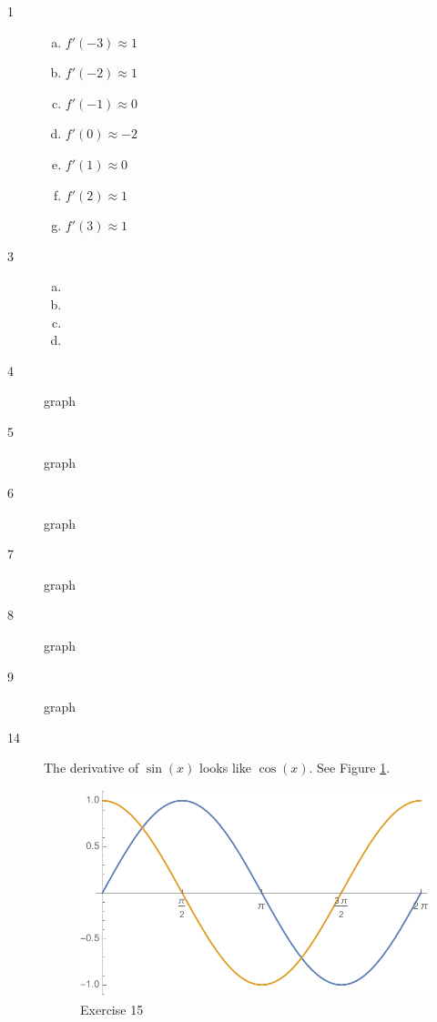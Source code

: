 \documentclass[letterpaper, landscape]{exam}
\begin{document}
    \begin{description}

      \item[1] 
        \begin{enumerate}[(a)]
          \item $f'(-3) \approx 1$
          \item $f'(-2) \approx 1$
          \item $f'(-1) \approx 0$
          \item $f'(0) \approx -2$
          \item $f'(1) \approx 0$
          \item $f'(2) \approx 1$
          \item $f'(3) \approx 1$
        \end{enumerate}

      \item[3] 
        \begin{enumerate}[(a)]
          \item {}
          \item {}
          \item {}
          \item {}
        \end{enumerate}

      \item[4] graph
      \item[5] graph
      \item[6] graph
      \item[7] graph
      \item[8] graph
      \item[9] graph

      \item[14]
        The derivative of $\sin(x)$ looks like $\cos(x)$. See Figure \ref{fig:ex14}.

        \begin{figure}[H]
          \centering
          \includegraphics[scale = 0.5]{ex14.pdf}
          \caption{Exercise 15}
          \label{fig:ex14}
        \end{figure}


\end{description}
\end{document}
